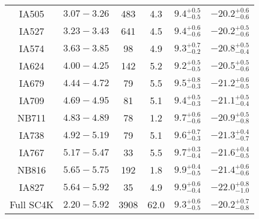 \documentclass[a4paper,fleqn,usenatbib]{mnras}
\begin{document}
\begin{table}
\begin{center}
\begin{tabular}{c | ccccc}
IA505 & $3.07-3.26$ & 483 & 4.3 & $9.4^{+0.5}_{-0.5}$ & $-20.2^{+0.6}_{-0.6}$ \\
IA527 & $3.23-3.43$ & 641 & 4.5 & $9.4^{+0.6}_{-0.6}$ & $-20.2^{+0.5}_{-0.6}$ \\
IA574 & $3.63-3.85$ & 98 & 4.9 & $9.3^{+0.7}_{-0.2}$ & $-20.8^{+0.5}_{-0.4}$ \\
IA624 & $4.00-4.25$ & 142 & 5.2 & $9.2^{+0.5}_{-0.5}$ & $-20.5^{+0.5}_{-0.6}$ \\
IA679 & $4.44-4.72$ & 79 & 5.5 & $9.5^{+0.8}_{-0.3}$ & $-21.2^{+0.6}_{-0.5}$ \\
IA709 & $4.69-4.95$ & 81 & 5.1 & $9.4^{+0.5}_{-0.3}$ & $-21.1^{+0.5}_{-0.4}$ \\
NB711 & $4.83-4.89$ & 78 & 1.2 & $9.7^{+0.6}_{-0.6}$ & $-20.9^{+0.5}_{-0.8}$ \\
IA738 & $4.92-5.19$ & 79 & 5.1 & $9.6^{+0.7}_{-0.3}$ & $-21.3^{+0.4}_{-0.7}$ \\
IA767 & $5.17-5.47$ & 33 & 5.5 & $9.7^{+0.3}_{-0.4}$ & $-21.6^{+0.4}_{-0.5}$ \\
NB816 & $5.65-5.75$ & 192 & 1.8 & $9.9^{+0.4}_{-0.5}$ & $-21.4^{+0.6}_{-0.6}$ \\
IA827 & $5.64-5.92$ & 35 & 4.9 & $9.9^{+0.6}_{-0.4}$ & $-22.0^{+0.8}_{-1.0}$ \\
\hline
Full SC4K & $2.20-5.92$ & 3908 & 62.0 & $9.3^{+0.6}_{-0.5}$ & $-20.2^{+0.7}_{-0.8}$\\
\hline
\end{tabular} \label{table:overview}
\end{center}
\end{table}
\end{document}
